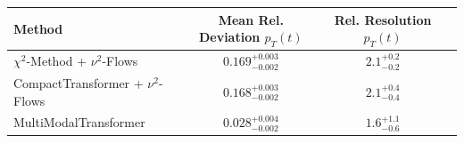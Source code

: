     \begin{tabular}{lccc}
        \toprule
        Method & Mean Rel. Deviation $p_{T}(t)$ & Rel. Resolution $p_{T}(t)$ \\
        \midrule
        $\chi^2$-Method + $\nu^2$-Flows & $0.169^{+0.003}_{-0.002}$ & $2.1^{+0.2}_{-0.2}$ \\
        CompactTransformer + $\nu^2$-Flows & $0.168^{+0.003}_{-0.002}$ & $2.1^{+0.4}_{-0.4}$ \\
        MultiModalTransformer & $0.028^{+0.004}_{-0.002}$ & $1.6^{+1.1}_{-0.6}$ \\
        \bottomrule
    \end{tabular}